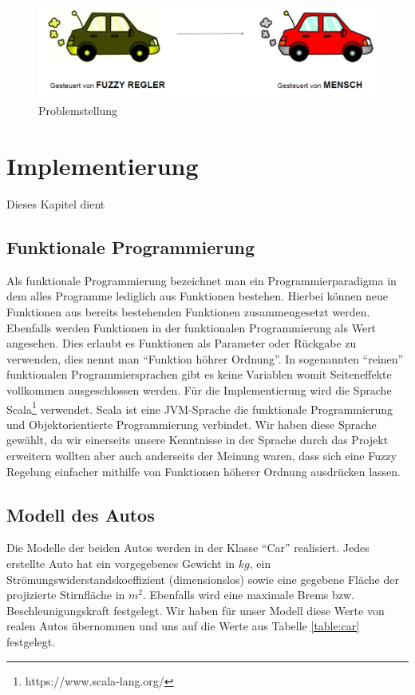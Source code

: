 \documentclass[12pt,a4paper,bibliography=totocnumbered,listof=totocnumbered, abstracton]{scrartcl}
\theoremstyle{Umgebung}
\begin{document}
\begin{figure}
	\centering
	\includegraphics[width=0.9\linewidth]{img/practical/problem}
	\caption{Problemstellung}
	\label{fig:problem}
\end{figure}

\section{Implementierung}

Dieses Kapitel dient 

\subsection{Funktionale Programmierung}

Als funktionale Programmierung bezeichnet man ein Programmierparadigma in dem alles Programme lediglich aus Funktionen bestehen. Hierbei können neue Funktionen aus bereits bestehenden Funktionen zusammengesetzt werden. Ebenfalls werden Funktionen in der funktionalen Programmierung als Wert angesehen. Dies erlaubt es Funktionen als Parameter oder Rückgabe zu verwenden, dies nennt man \enquote{Funktion höhrer Ordnung}. In sogenannten \enquote{reinen} funktionalen Programmiersprachen gibt es keine Variablen womit Seiteneffekte vollkommen ausgeschlossen werden. Für die Implementierung wird die Sprache Scala\footnote{https://www.scala-lang.org/} verwendet. Scala ist eine JVM-Sprache die funktionale Programmierung und Objektorientierte Programmierung verbindet. Wir haben diese Sprache gewählt, da wir einerseits unsere Kenntnisse in der Sprache durch das Projekt erweitern wollten aber auch anderseits der Meinung waren, dass sich eine Fuzzy Regelung einfacher mithilfe von Funktionen höherer Ordnung ausdrücken lassen.

\subsection{Modell des Autos}

Die Modelle der beiden Autos werden in der Klasse \enquote{Car} realisiert. Jedes erstellte Auto hat ein vorgegebenes Gewicht in $kg$, ein Strömungswiderstandskoeffizient (dimensionslos) sowie eine gegebene Fläche der projizierte Stirnfläche in $m^2$. Ebenfalls wird eine maximale Brems bzw. Beschleunigungskraft festgelegt. Wir haben für unser Modell diese Werte von realen Autos übernommen und uns auf die Werte aus Tabelle \ref{table:car} festgelegt.
\end{document}
